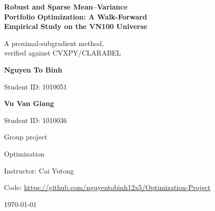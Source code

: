 \documentclass[10pt,a4paper]{article}
\begin{document}
\hypersetup{pageanchor=false}
\begin{titlepage}
\centering
\vspace*{2cm}
{\LARGE\bfseries Robust and Sparse Mean--Variance\\[0.3em]
Portfolio Optimization: A Walk-Forward\\[0.3em]
Empirical Study on the VN100 Universe\par}
\vspace{0.8cm}
{\large A proximal-subgradient method,\\
verified against CVXPY/CLARABEL\par}
\vspace{2.5cm}
{\large\bfseries Nguyen To Binh\par}
{\large Student ID: 1010051\par}
\vspace{0.3cm}
{\large\bfseries Vu Van Giang\par}
{\large Student ID: 1010036\par}
\vspace{0.4cm}
{\large Group project\par}
\vspace{2.5cm}
{\large Optimization\par}
\vspace{0.3cm}
{\large Instructor: Cai Yutong\par}
\vspace{0.8cm}
{\large Code: \url{https://github.com/nguyentobinh12x5/Optimization-Project}\par}
\vfill
{\large \today\par}
\end{titlepage}

\setcounter{page}{1}
\hypersetup{pageanchor=true}













\appendix

\end{document}
